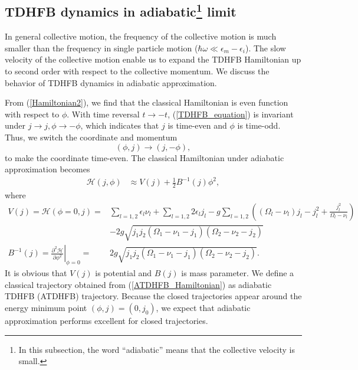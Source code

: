 \documentclass[11pt]{book} %
\begin{document}
\subsection{TDHFB dynamics in adiabatic\footnote{In this subsection, the word ``adiabatic'' means that the collective velocity is small.} limit}
\label{ATDHFB}
In general collective motion, the frequency of the collective motion is much smaller than the frequency in single particle motion ($\hbar\omega\ll\epsilon_m-\epsilon_i$). The slow velocity of the collective motion enable us to expand the TDHFB Hamiltonian up to second order with respect to the collective momentum. We discuss the behavior of TDHFB dynamics in adiabatic approximation.\par
From (\ref{Hamiltonian2}), we find that the classical Hamiltonian is even function with respect to $\phi$. With time reversal $t\to-t$, (\ref{TDHFB_equation}) is invariant under $j\to j, \phi\to -\phi$, which indicates that $j$ is time-even and $\phi$ is time-odd. Thus, we switch the coordinate and momentum 
\begin{equation}
	(\phi,j)\to(j,-\phi) ,
	\label{switch}
\end{equation}
to make the coordinate time-even. The classical Hamiltonian under adiabatic approximation becomes
\begin{align}
  \mathcal{H}(j,\phi) &\approx V(j) + \frac{1}{2}B^{-1}(j)\phi^2,
  \label{ATDHFB_Hamiltonian}
\end{align}
where 
\begin{align}
	V(j) = \mathcal{H}(\phi=0,j) 
	=& \sum_{l=1,2} \epsilon_l\nu_l + \sum_{l=1,2} 2\epsilon_lj_l - g\sum_{l=1,2} \left( (\Omega_l-\nu_l) j_l - j_l^2 +\frac{j_l^2}{\Omega_l-\nu_l} \right) \nonumber \\
	&- 2g\sqrt{j_1j_2(\Omega_{1}-\nu_{1}-j_{1})(\Omega_{2}-\nu_{2}-j_{2})} \\
	B^{-1}(j) = \left. \frac{\partial^2\mathcal{H}}{\partial\phi^2} \right|_{\phi=0}
	=& 2g\sqrt{j_1j_2(\Omega_{1}-\nu_{1}-j_{1})(\Omega_{2}-\nu_{2}-j_{2})} .
	\label{mass_two_level}
\end{align}
It is obvious that $V(j)$ is potential and $B(j)$ is mass parameter. We define a classical trajectory obtained from (\ref{ATDHFB_Hamiltonian}) as adiabatic TDHFB (ATDHFB) trajectory. Because the closed trajectories appear around the energy minimum point $(\phi,j)=(0,j_0)$, we expect that adiabatic approximation performs excellent for closed trajectories.
\end{document}
